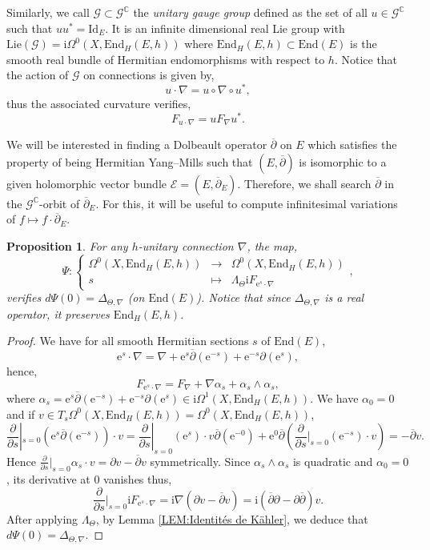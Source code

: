 \documentclass{article}
\newtheorem{proposition}[theorem]{Proposition}
\theoremstyle{remark}
\theoremstyle{definition}
\newcommand{\C}{\mathbb{C}}
\newcommand{\End}{\mathrm{End}}
\newcommand{\Lie}{\mathrm{Lie}}
\newcommand{\Id}{\mathrm{Id}}
\renewcommand{\i}{\boldsymbol{\mathrm{i}}}
\newcommand{\e}{\boldsymbol{\mathrm{e}}}
\newcommand{\E}{\mathcal{E}}
\newcommand{\G}{\mathcal{G}}
\newcommand{\dbar}{\overline{\partial}}
\newcommand{\fonction}[4]{\left\{ \begin{array}{rcl}
		\displaystyle #1 & \longrightarrow & \displaystyle #2\\
		\displaystyle #3 & \longmapsto & \displaystyle #4
	\end{array} \right.}
\begin{document}
Similarly, we call $\G \subset \G^\C$ the \textit{unitary gauge group} defined as the set of all $u \in \G^\C$ such that $uu^* = \Id_E$. It is an infinite dimensional real Lie group with $\Lie(\G) = \i\Omega^0(X,\End_H(E,h))$ where $\End_H(E,h) \subset \End(E)$ is the smooth real bundle of Hermitian endomorphisms with respect to $h$. Notice that the action of $\G$ on connections is given by,
$$
u \cdot \nabla = u \circ \nabla \circ u^*,
$$
thus the associated curvature verifies,
\begin{equation}\label{EQ:Action gauge unitaire}
    F_{u \cdot \nabla} = uF_\nabla u^*.
\end{equation}

We will be interested in finding a Dolbeault operator $\dbar$ on $E$ which satisfies the property of being Hermitian Yang--Mills such that $(E,\dbar)$ is isomorphic to a given holomorphic vector bundle $\E = (E,\dbar_E)$. Therefore, we shall search $\dbar$ in the $\G^\C$-orbit of $\dbar_E$. For this, it will be useful to compute infinitesimal variations of $f \mapsto f \cdot \dbar_E$.

\begin{proposition}\label{PRO:Calcul dPsi(0)}
    For any $h$-unitary connection $\nabla$, the map,
    $$
    \Psi : \fonction{\Omega^0(X,\End_H(E,h))}{\Omega^0(X,\End_H(E,h))}{s}{\Lambda_\Theta\i F_{\e^s \cdot \nabla}},
    $$
    verifies $d\Psi(0) = \Delta_{\Theta,\nabla}$ (on $\End(E)$). Notice that since $\Delta_{\Theta,\nabla}$ is a real operator, it preserves $\End_H(E,h)$.
\end{proposition}
\begin{proof}
We have for all smooth Hermitian sections $s$ of $\End(E)$,
$$
\e^s \cdot \nabla = \nabla + \e^s\dbar(\e^{-s}) + \e^{-s}\partial(\e^s),
$$
hence,
$$
F_{\e^s \cdot \nabla} = F_\nabla + \nabla\alpha_s + \alpha_s \wedge \alpha_s,
$$
where $\alpha_s = \e^s\dbar(\e^{-s}) + \e^{-s}\partial(\e^s) \in \i\Omega^1(X,\End_H(E,h))$. We have $\alpha_0 = 0$ and if $v \in T_s\Omega^0(X,\End_H(E,h)) = \Omega^0(X,\End_H(E,h))$,
$$
\frac{\partial}{\partial s}|_{s = 0}(\e^s\dbar(\e^{-s})) \cdot v = \frac{\partial}{\partial s}|_{s = 0}(\e^s) \cdot v\dbar(\e^{-0}) + \e^0\dbar\left(\frac{\partial}{\partial s}|_{s = 0}(\e^{-s}) \cdot v\right) = -\dbar v.
$$
Hence $\frac{\partial}{\partial s}|_{s = 0}\alpha_s \cdot v = \partial v - \dbar v$ symmetrically. Since $\alpha_s \wedge \alpha_s$ is quadratic and $\alpha_0 = 0$, its derivative at $0$ vanishes thus,
$$
\frac{\partial}{\partial s}|_{s = 0}\i F_{\e^s \cdot \nabla} = \i\nabla(\partial v - \dbar v) = \i(\dbar\partial - \partial\dbar)v.
$$
After applying $\Lambda_\Theta$, by Lemma \ref{LEM:Identités de Kähler}, we deduce that $d\Psi(0) = \Delta_{\Theta,\nabla}$.
\end{proof}
\end{document}
